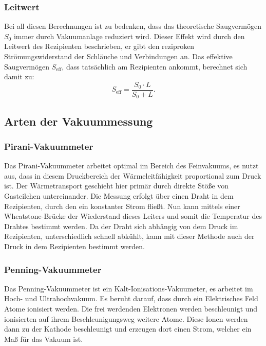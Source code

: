 		\subsubsection{Leitwert}

			\noindent
			Bei all diesen Berechnungen ist zu bedenken, dass das theoretische Saugvermögen $S_0$ immer durch Vakuumanlage reduziert wird.
			Dieser Effekt wird durch den Leitwert des Rezipienten beschrieben, er gibt den reziproken Strömungswiderstand der Schläuche und Verbindungen an.
			Das effektive Saugvermögen $S_\text{eff}$, dass tatsächlich am Rezipienten ankommt, berechnet sich damit zu:
			\begin{equation}
				S_\text{eff} = \frac{S_0 \cdot L}{S_0 + L}.
			\end{equation}

	\subsection{Arten der Vakuummessung}
		
		\subsubsection{Pirani-Vakuummeter}
			
			\noindent
			Das Pirani-Vakuummeter arbeitet optimal im Bereich des Feinvakuums, es nutzt aus, dass in diesem Druckbereich der Wärmeleitfähigkeit proportional zum Druck ist. 
			Der Wärmetransport geschieht hier primär durch direkte Stöße von Gasteilchen untereinander. 
			Die Messung erfolgt über einen Draht in dem Rezipienten, durch den ein konstanter Strom fließt.
			Nun kann mittels einer Wheatstone-Brücke der Wiederstand dieses Leiters und somit die Temperatur des Drahtes bestimmt werden.
			Da der Draht sich abhängig von dem Druck im Rezipienten, unterschiedlich schnell abkühlt, kann mit dieser Methode auch der Druck in dem Rezipienten bestimmt werden.

		\subsubsection{Penning-Vakuummeter}

			\noindent
			Das Penning-Vakuummeter ist ein Kalt-Ionisations-Vakuumeter, es arbeitet im Hoch- und Ultrahochvakuum. 
			Es beruht darauf, dass durch ein Elektrisches Feld Atome ionisiert werden.
			Die frei werdenden Elektronen werden beschleunigt und ionisierten auf ihrem Beschleunigungsweg weitere Atome.
			Diese Ionen werden dann zu der Kathode beschleunigt und erzeugen dort einen Strom, welcher ein Maß für das Vakuum ist.

